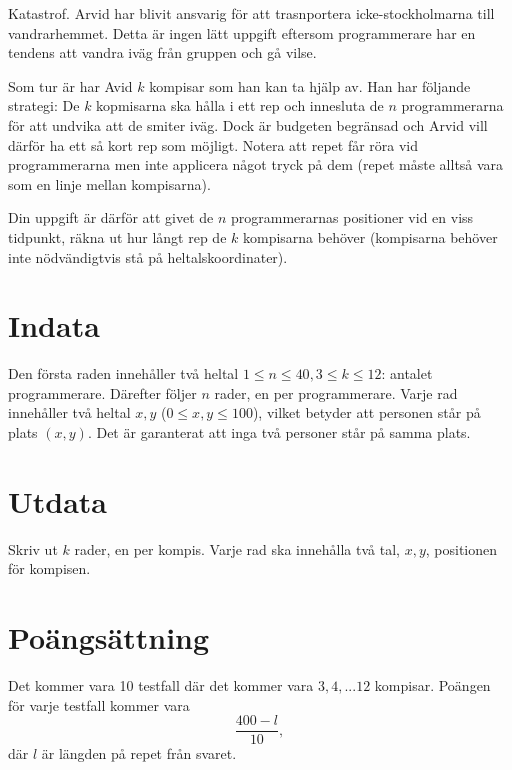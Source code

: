 
Katastrof. Arvid har blivit ansvarig för att trasnportera icke-stockholmarna till vandrarhemmet. Detta är ingen lätt uppgift eftersom programmerare har en tendens att vandra iväg från gruppen och gå vilse. 

Som tur är har Avid $k$ kompisar som han kan ta hjälp av. Han har följande strategi: De $k$ kopmisarna ska hålla i ett rep och innesluta de $n$ programmerarna för att undvika att de smiter iväg. Dock är budgeten begränsad och Arvid vill därför ha ett så kort rep som möjligt. Notera att repet får röra vid programmerarna men inte applicera något tryck på dem (repet måste alltså vara som en linje mellan kompisarna). 

Din uppgift är därför att givet de $n$ programmerarnas positioner vid en viss tidpunkt, räkna ut hur långt rep de $k$  kompisarna behöver (kompisarna behöver inte nödvändigtvis stå på heltalskoordinater). 

\section*{Indata}
Den första raden innehåller två heltal $1 \le n \le 40, 3 \le k \le 12$: antalet programmerare.
Därefter följer $n$ rader, en per programmerare.
Varje rad innehåller två heltal $x, y$ ($0 \le x, y \le 100$), vilket betyder att personen står på plats $(x, y)$. Det är garanterat att inga två personer står på samma plats.

\section*{Utdata}
Skriv ut $k$ rader, en per kompis. Varje rad ska innehålla två tal, $x, y$, positionen för kompisen.

\section*{Poängsättning}
Det kommer vara 10 testfall där det kommer vara $3, 4, ... 12$ kompisar. Poängen för varje testfall kommer vara $$\frac{400 - l}{10},$$ där $l$ är längden på repet från svaret. 